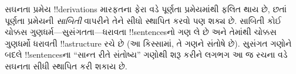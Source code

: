 \documentclass[../../../include/open-logic-section]{subfiles}
\begin{document}
સઘનતા પ્રમેય !!{derivation}s મારફતના ફેરા વડે પૂર્ણતા પ્રમેયમાંથી
ફલિત થાય છે, છતાં પૂર્ણતા પ્રમેયની \emph{સાબિતી} વાપરીને તેને સીધો
સ્થાપિત કરવો પણ શક્ય છે. સાબિતી કોઈ ચોક્કસ ગુણધર્મ—સુસંગતતા—ધરાવતા
!!{sentence}sનો ગણ લે છે અને તેમાંથી ચોક્કસ ગુણધર્મો ધરાવતી
!!a{structure} રચે છે (આ કિસ્સામાં, તે ગણને સંતોષે છે). સુસંગત ગણોને
બદલે !!{sentence}sના ``સાન્ત રીતે સંતોષ્ય'' ગણોથી શરૂ કરીને લગભગ આ જ
રચના વડે સઘનતા સીધી સ્થાપિત કરી શકાય છે.

\end{document}
